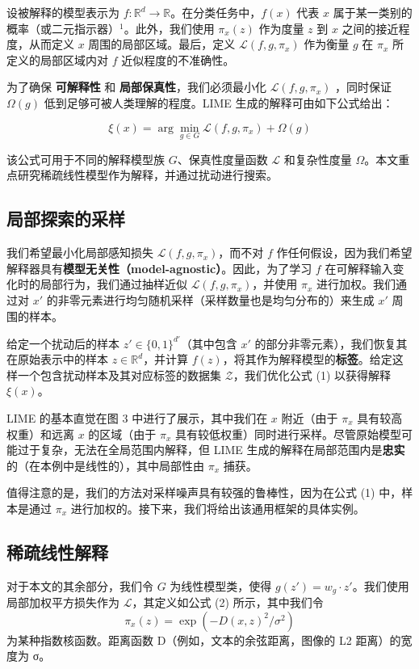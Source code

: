 \documentclass[12pt, a4paper]{ctexart} %
\begin{document}
设被解释的模型表示为 \( f: \mathbb{R}^d \to \mathbb{R} \)。在分类任务中，\( f(x) \) 代表 \( x \) 属于某一类别的概率（或二元指示器）\(^1\)。此外，我们使用 \( \pi_x(z) \) 作为度量 \( z \) 到 \( x \) 之间的接近程度，从而定义 \( x \) 周围的局部区域。最后，定义 \( \mathcal{L}(f, g, \pi_x) \) 作为衡量 \( g \) 在 \( \pi_x \) 所定义的局部区域内对 \( f \) 近似程度的不准确性。

为了确保 \textbf{可解释性} 和 \textbf{局部保真性}，我们必须最小化 \( \mathcal{L}(f, g, \pi_x) \) ，同时保证 \( \Omega(g) \) 低到足够可被人类理解的程度。LIME 生成的解释可由如下公式给出：

\[
\xi(x) = \arg\min_{g \in G} \mathcal{L}(f, g, \pi_x) + \Omega(g)
\]

该公式可用于不同的解释模型族 \( G \)、保真性度量函数 \( \mathcal{L} \) 和复杂性度量 \( \Omega \)。本文重点研究稀疏线性模型作为解释，并通过扰动进行搜索。
\subsection{局部探索的采样}
我们希望最小化局部感知损失 \( \mathcal{L}(f, g, \pi_x) \)，而不对 \( f \) 作任何假设，因为我们希望解释器具有\textbf{模型无关性（model-agnostic）}。因此，为了学习 \( f \) 在可解释输入变化时的局部行为，我们通过抽样近似 \( \mathcal{L}(f, g, \pi_x) \)，并使用 \( \pi_x \) 进行加权。我们通过对 \( x' \) 的非零元素进行均匀随机采样（采样数量也是均匀分布的）来生成 \( x' \) 周围的样本。

给定一个扰动后的样本 \( z' \in \{0,1\}^{d'} \)（其中包含 \( x' \) 的部分非零元素），我们恢复其在原始表示中的样本 \( z \in \mathbb{R}^d \)，并计算 \( f(z) \)，将其作为解释模型的\textbf{标签}。给定这样一个包含扰动样本及其对应标签的数据集 \( \mathcal{Z} \)，我们优化公式 (1) 以获得解释 \( \xi(x) \)。

LIME 的基本直觉在图 3 中进行了展示，其中我们在 \( x \) 附近（由于 \( \pi_x \) 具有较高权重）和远离 \( x \) 的区域（由于 \( \pi_x \) 具有较低权重）同时进行采样。尽管原始模型可能过于复杂，无法在全局范围内解释，但 LIME 生成的解释在局部范围内是\textbf{忠实}的（在本例中是线性的），其中局部性由 \( \pi_x \) 捕获。

值得注意的是，我们的方法对采样噪声具有较强的鲁棒性，因为在公式 (1) 中，样本是通过 \( \pi_x \) 进行加权的。接下来，我们将给出该通用框架的具体实例。
\subsection{稀疏线性解释}
对于本文的其余部分，我们令 \( G \) 为线性模型类，使得 \( g(z') = w_g \cdot z' \)。我们使用局部加权平方损失作为 \( \mathcal{L} \)，其定义如公式 (2) 所示，其中我们令
\[
\pi_x(z) = \exp(-D(x, z)^2 / \sigma^2)
\]
为某种指数核函数。距离函数 D（例如，文本的余弦距离，图像的 L2 距离）的宽度为 σ。
\end{document}
